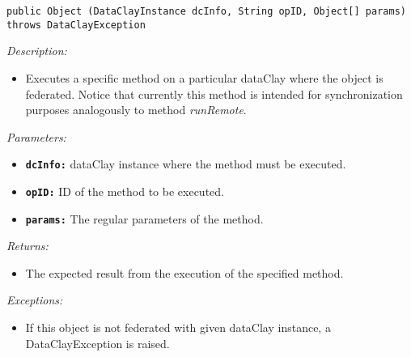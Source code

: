 \begin{dBox}
\texttt{public Object (DataClayInstance dcInfo, \newline String opID, Object[] params) throws DataClayException}
\LINE

{\it Description:}

\begin{itemize}
  \item Executes a specific method on a particular dataClay where the object is federated. Notice that currently this method is intended for synchronization purposes analogously to method \textit{runRemote}.
\end{itemize}

{\it Parameters:}

\begin{itemize}
  \item \texttt{\bfseries dcInfo:} dataClay instance where the method must be executed.
  \item \texttt{\bfseries opID:} ID of the method to be executed.
  \item \texttt{\bfseries params:} The regular parameters of the method.
\end{itemize}
 
{\it Returns:}

\begin{itemize}
  \item The expected result from the execution of the specified method.
\end{itemize}

{\it Exceptions:}

\begin{itemize}
  \item If this object is not federated with given dataClay instance, a DataClayException is raised.
\end{itemize}

\end{dBox}
